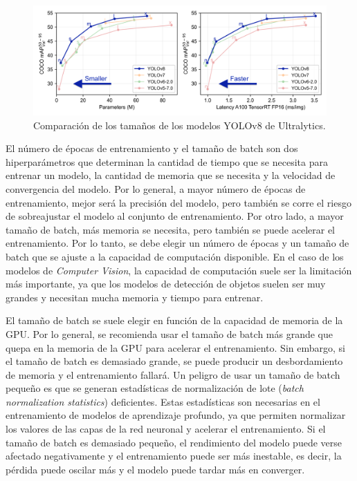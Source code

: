 \begin{figure}[H]
    \centering
    \includegraphics[width=1\textwidth]{graphs/yolo-comparison-plots.png}
    \caption{Comparación de los tamaños de los modelos YOLOv8 de Ultralytics.}
    \label{fig:yolo-comparison-plots}
\end{figure}

El número de épocas de entrenamiento y el tamaño de batch son dos hiperparámetros que determinan la cantidad de tiempo que se necesita para entrenar un modelo, la cantidad de memoria que se necesita y la velocidad de convergencia del modelo. Por lo general, a mayor número de épocas de entrenamiento, mejor será la precisión del modelo, pero también se corre el riesgo de sobreajustar el modelo al conjunto de entrenamiento. Por otro lado, a mayor tamaño de batch, más memoria se necesita, pero también se puede acelerar el entrenamiento. Por lo tanto, se debe elegir un número de épocas y un tamaño de batch que se ajuste a la capacidad de computación disponible. En el caso de los modelos de \textit{Computer Vision}, la capacidad de computación suele ser la limitación más importante, ya que los modelos de detección de objetos suelen ser muy grandes y necesitan mucha memoria y tiempo para entrenar.

El tamaño de batch se suele elegir en función de la capacidad de memoria de la GPU. Por lo general, se recomienda usar el tamaño de batch más grande que quepa en la memoria de la GPU para acelerar el entrenamiento. Sin embargo, si el tamaño de batch es demasiado grande, se puede producir un desbordamiento de memoria y el entrenamiento fallará. Un peligro de usar un tamaño de batch pequeño es que se generan estadísticas de normalización de lote (\textit{batch normalization statistics}) deficientes. Estas estadísticas son necesarias en el entrenamiento de modelos de aprendizaje profundo, ya que permiten normalizar los valores de las capas de la red neuronal y acelerar el entrenamiento. Si el tamaño de batch es demasiado pequeño, el rendimiento del modelo puede verse afectado negativamente y el entrenamiento puede ser más inestable, es decir, la pérdida puede oscilar más y el modelo puede tardar más en converger.

